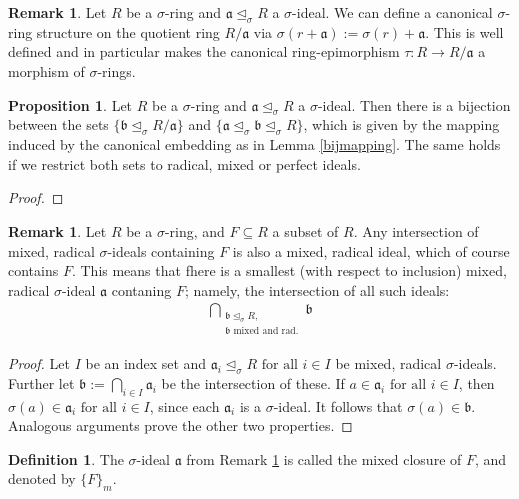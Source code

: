 \documentclass[12pt,a4paper,BCOR15mm,twoside,DIV12]{article}
\def\a{\mathfrak{a}}
\def\b{\mathfrak{b}}
\def\s{\sigma}
\def\si{\unlhd_{\sigma}}
\def\fa{\text{ for all }}
\newenvironment{bew}{\begin{proof}[Proof]}{\end{proof}}
\theoremstyle{definition}
\newtheorem{prop}[Satz]{Proposition}
\newtheorem{rem}[Satz]{Remark}
\newtheorem{defn}[Satz]{Definition}
\begin{document}
\begin{rem}
Let $R$ be a $\s$-ring and $\a \si R$ a $\s$-ideal. We can define a canonical $\s$-ring structure on the quotient ring $R/\a$ via $\s(r+\a):= \s(r) + \a$. 
This is well defined and in particular makes the canonical ring-epimorphism $\tau: R \rightarrow R/\a$ a morphism of $\s$-rings.
\end{rem}

\begin{prop}
Let $R$ be a $\s$-ring and $\a \si R$ a $\s$-ideal. Then there is a bijection between the sets $\{ \b \si R/\a \}$ and $\{ \a \si \b \si R \}$, which is given by the mapping induced by the canonical embedding as in Lemma \ref{bijmapping}. The same holds if we restrict both sets to radical, mixed or perfect ideals.
\begin{bew}

\end{bew}
\end{prop}

\begin{rem}\label{wmwelldef}
Let $R$ be a $\s$-ring, and $F \subseteq R$ a subset of $R$. Any intersection of mixed, radical $\s$-ideals containing $F$ is also a mixed, radical ideal, which of course contains $F$. 
This means that fhere is a smallest (with respect to inclusion) mixed, radical $\s$-ideal $\a$ contaning $F$; namely, the intersection of all such ideals:
\begin{align*} \bigcap_{\substack{ \b \si R, \\ \b \text{ mixed and rad.}}} \b \end{align*}
\begin{proof}
Let $I$ be an index set and $\a_i \si R \fa i \in I$ be mixed, radical $\s$-ideals. Further let $\b := \bigcap_{i \in I} \a_i$ be the intersection of these. If $a \in \a_i \fa i \in I$, then $\s(a) \in \a_i \fa i \in I$, since each $\a_i$ is a $\s$-ideal.
It follows that $\s(a) \in \b$. Analogous arguments prove the other two properties.
\end{proof}
\end{rem}

\begin{defn}
The $\s$-ideal $\a$ from Remark \ref{wmwelldef} is called the mixed closure of $F$, and denoted by $\{F\}_{m}$.
\end{defn}
\end{document}
